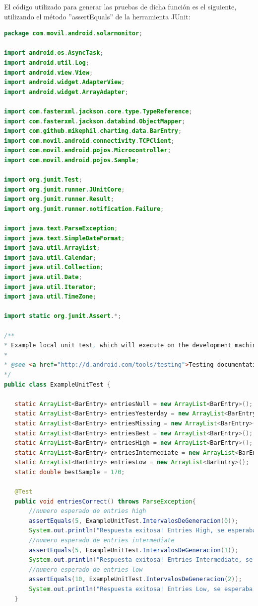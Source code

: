 El código utilizado para generar las pruebas de dicha función es el siguiente, utilizando el método ''assertEquals'' de la herramienta JUnit:\\ \newline
\begin{lstlisting}[language= Java, frame=single]
package com.movil.android.solarmonitor;

import android.os.AsyncTask;
import android.util.Log;
import android.view.View;
import android.widget.AdapterView;
import android.widget.ArrayAdapter;

import com.fasterxml.jackson.core.type.TypeReference;
import com.fasterxml.jackson.databind.ObjectMapper;
import com.github.mikephil.charting.data.BarEntry;
import com.movil.android.connectivity.TCPClient;
import com.movil.android.pojos.Microcontroller;
import com.movil.android.pojos.Sample;

import org.junit.Test;
import org.junit.runner.JUnitCore;
import org.junit.runner.Result;
import org.junit.runner.notification.Failure;

import java.text.ParseException;
import java.text.SimpleDateFormat;
import java.util.ArrayList;
import java.util.Calendar;
import java.util.Collection;
import java.util.Date;
import java.util.Iterator;
import java.util.TimeZone;

import static org.junit.Assert.*;

/**
* Example local unit test, which will execute on the development machine (host).
*
* @see <a href="http://d.android.com/tools/testing">Testing documentation</a>
*/
public class ExampleUnitTest {

   static ArrayList<BarEntry> entriesNull = new ArrayList<BarEntry>();
   static ArrayList<BarEntry> entriesYesterday = new ArrayList<BarEntry>();
   static ArrayList<BarEntry> entriesMissing = new ArrayList<BarEntry>();
   static ArrayList<BarEntry> entriesBest = new ArrayList<BarEntry>();
   static ArrayList<BarEntry> entriesHigh = new ArrayList<BarEntry>();
   static ArrayList<BarEntry> entriesIntermediate = new ArrayList<BarEntry>();
   static ArrayList<BarEntry> entriesLow = new ArrayList<BarEntry>();
   static double bestSample = 170;

   @Test
   public void entriesCorrect() throws ParseException{
       //numero esperado de entries high
       assertEquals(5, ExampleUnitTest.IntervalosDeGeneracion(0));
       System.out.println("Respuesta exitosa! Entries High, se esperaba un 5 y se recibió "+ExampleUnitTest.IntervalosDeGeneracion(0));
       //numero esperado de entries intermediate
       assertEquals(5, ExampleUnitTest.IntervalosDeGeneracion(1));
       System.out.println("Respuesta exitosa! Entries Intermediate, se esperaba un 5 y se recibió "+ExampleUnitTest.IntervalosDeGeneracion(1));
       //numero esperado de entries low
       assertEquals(10, ExampleUnitTest.IntervalosDeGeneracion(2));
       System.out.println("Respuesta exitosa! Entries Low, se esperaba un 10 y se recibió "+ExampleUnitTest.IntervalosDeGeneracion(2));
   }


\end{lstlisting}
